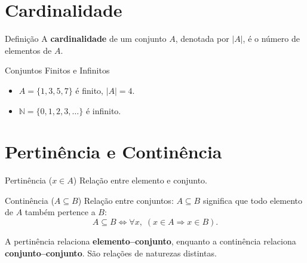 \documentclass[12pt,a4paper,openright]{book}
\begin{document}
\section{Cardinalidade}

\begin{block}{Definição}
A \textbf{cardinalidade} de um conjunto \(A\), denotada por \(|A|\), é o número de elementos de \(A\).
\end{block}

\begin{block}{Conjuntos Finitos e Infinitos}
\begin{itemize}
    \item \(A = \{1,3,5,7\}\) é finito, \(|A|=4\).
    \item \(\mathbb{N} = \{0,1,2,3,\dots\}\) é infinito.
\end{itemize}
\end{block}

\section{Pertinência e Continência}

\begin{block}{Pertinência (\(x \in A\))}
Relação entre elemento e conjunto.
\end{block}

\begin{block}{Continência (\(A \subseteq B\))}
Relação entre conjuntos: \(A \subseteq B\) significa que todo elemento de \(A\) também pertence a \(B\):
\[
A \subseteq B \iff \forall x,\; (x \in A \Rightarrow x \in B).
\]
\end{block}

\begin{observacao}
A pertinência relaciona \textbf{elemento–conjunto}, enquanto a continência relaciona \textbf{conjunto–conjunto}. São relações de naturezas distintas.
\end{observacao}
\end{document}
